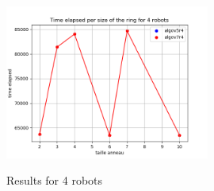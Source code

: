 \documentclass{article}
\begin{document}
\begin{figure}[!h]
    \centering
    \includegraphics[width=0.6\textwidth]{../data/data-phiR24/compar_phiR24_4.png}\label{phiR24r4}
    \caption{Results for 4 robots}
\end{figure}
\FloatBarrier
\newpage
\printbibliography %
\end{document}
